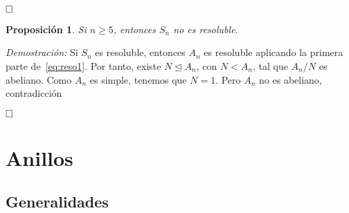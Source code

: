 \documentclass[12pt]{article}
\newtheorem{proposition}[theorem]{Proposición}
\begin{document}
$\hfill \square$

\begin{proposition}Si $n\geq 5$, entonces $S_n$ no es resoluble.
\end{proposition}
\emph{Demostración: }Si $S_n$ es resoluble, entonces $A_n$ es resoluble aplicando la primera parte de~\ref{eq:reso1}. Por tanto, existe $N \unlhd A_n$, con $N < A_n$, tal que $A_n/N$ es abeliano. Como $A_n$ es simple, tenemos que $N = 1$. Pero $A_n$ no es abeliano, contradicción

$\hfill \square$


\section{Anillos}
\subsection{Generalidades}
\end{document}
